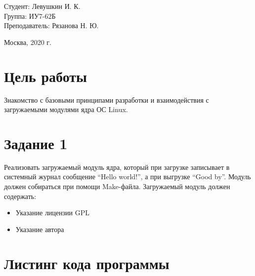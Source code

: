 \documentclass[a4paper,12pt]{article}
\begin{document}
	\large
	\begin{flushright}
		Студент: Левушкин И. К. \\
		Группа: ИУ7-62Б \\
		Преподаватель: Рязанова Н. Ю. \\
	\end{flushright}
	
	\vspace*{30mm}
	\begin{center}
		Москва, 2020 г.  
	\end{center}
	\thispagestyle{empty}
	
	\newpage
	
	\section*{Цель работы}
	
	Знакомство с базовыми принципами разработки и взаимодействия с загружаемыми модулями ядра ОС Linux.
	
	\section*{Задание 1}
	
	Реализовать загружаемый модуль ядра, который при загрузке записывает в системный журнал сообщение “Hello world!”, а при выгрузке “Good by”. Модуль должен собираться при помощи Make-файла. 
	Загружаемый модуль должен содержать:
	\begin{itemize}
		\item Указание лицензии GPL
		\item Указание автора
	\end{itemize}

	\newpage

	\section*{Листинг кода программы}
	
\end{document}
